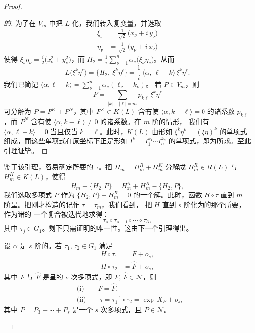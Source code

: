 \begin{proof}
\begin{proof}[\trhLemma{}的\trhProof]
为了在 $V_m$ 中把 $L$ \trDiagonal{}化，我们转入复变量，并选取%
\trSymplecticCoordinates
\begin{align*}
\xi_\nu &=\tfrac{1}{\sqrt{2}}\ \bigl(x_\nu+i\,y_\nu\bigr)\\
\eta_\nu &=\tfrac{1}{\sqrt{2}}\ \bigl(y_\nu+i\,x_\nu\bigr)
\end{align*}
使得 $\xi_\nu\eta_\nu=\tfrac{i}{2}\bigl(x_\nu^{2}+y_\nu^{2}\bigr)$，而%
$H_2=\tfrac{1}{i}\sum_{\nu=1}^{n}\alpha_\nu\bigl(\xi_\nu\eta_\nu\bigr)$。从而
\[
L\bigl(\xi^{k}\eta^{\ell}\bigr)=\bigl\{H_2,\ \xi^{k}\eta^{\ell}\bigr\}
=\frac{1}{i}\,\bigl\langle\alpha,\ \ell-k\bigr\rangle\,\xi^{k}\eta^{\ell}.
\]
我们已简记 $\langle\alpha,\ell-k\rangle=\sum_{\nu=1}^{n}\alpha_\nu(\ell_\nu-k_\nu)$。%
若 $P\in V_m$，则
\[
P=\sum_{|k|+|\ell|=m}p_{k\ell}\,\xi^{k}\eta^{\ell}
\]
可分解为 $P=P^{K}+P^{N}$，其中 $P^{K}\in K(L)$ 含有使%
$\langle\alpha,k-\ell\rangle=0$ 的诸系数 $p_{k\ell}$，而 $P^{N}$ 含有使%
$\langle\alpha,k-\ell\rangle\neq0$ 的诸系数。在 $m$ 阶\trNonresonance{}的情形，%
我们有 $\langle\alpha,\ell-k\rangle=0$ 当且仅当 $k=\ell$。此时，$K(L)$ 由形如%
$\xi^{k}\eta^{k}=(\xi\eta)^{k}$ 的单项式组成，而这些单项式在原坐标下正是形如%
$I^{k}=I_1^{k_1}\dotsb I_n^{k_n}$ 的单项式，即为所求。至此引理证毕。
\end{proof}

鉴于该引理，容易确定所要的\trMapping{} $\tau$。把 $H_m=H_m^{R}+H_m^{K}$ 分解成%
$H_m^{R}\in R(L)$ 与 $H_m^{K}\in K(L)$，使得
\[
H_m-\{H_2,P\}=H_m^{R}+H_m^{K}-\{H_2,P\},
\]
我们选取多项式 $P$ 作为 $\{H_2,P\}-H_m^{R}=0$ 的一个解。此时，函数 $H\circ\tau$%
直到 $m$ 阶呈\trNormalForm。把刚才构造的\trMapping{}记作 $\tau=\tau_m$，我们看到，%
把 $H$ 直到 $s$ 阶化为\trNormalForm{}的那个所要\trMapping{}，作为诸\trMapping{}的%
一个复合被迭代地求得：
\[
\tau_s\circ\tau_{s-1}\circ\dotsb\circ\tau_3,
\]
其中 $\tau_j\in G_1$。剩下只需证明\trNormalForm{}的唯一性。这由下一个引理得出。

\begin{lemma}\label{lem:normal-form-uniqueness}
设 $\alpha$ 是 $s$ 阶\trNonresonance{}的。若 $\tau_1$, $\tau_2\in G_1$ 满足
\begin{align*}
H\circ\tau_1 &= F+o_s,\\
H\circ\tau_2 &= \hat{F}+o_s,
\end{align*}
其中 $F$ 与 $\hat{F}$ 是呈\trNormalForm{}的 $s$ 次多项式，即%
$F$, $\hat{F}\in\mathcal{N}$，则
\begin{align*}
&\text{(i)}\qquad F=\hat{F},\\
&\text{(ii)}\qquad \tau=\tau_1^{-1}\circ\tau_2=\exp\,X_P+o_s,
\end{align*}
其中 $P=P_3+\dotsb+P_s$ 是一个 $s$ 次多项式，且 $P\in\mathcal{N}$。
\end{lemma}


\end{proof}
